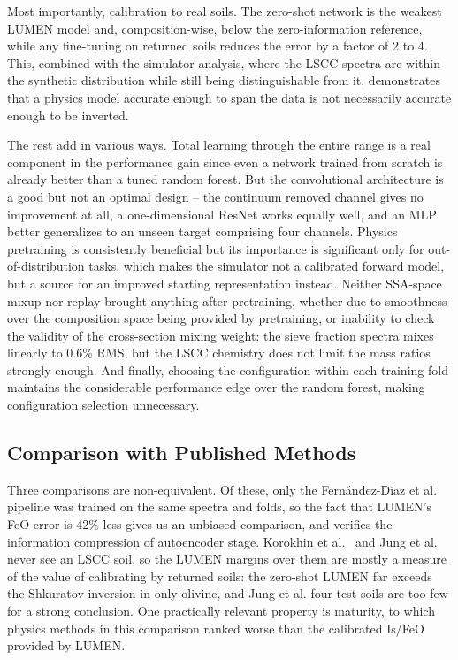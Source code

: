 \documentclass[remotesensing,article,submit,pdftex,moreauthors]{Definitions/mdpi}
\begin{document}
Most importantly, calibration to real soils. The zero-shot network is the weakest LUMEN model and, composition-wise, below the zero-information reference, while any fine-tuning on returned soils reduces the error by a factor of 2 to 4. This, combined with the simulator analysis, where the LSCC spectra are within the synthetic distribution while still being distinguishable from it, demonstrates that a physics model accurate enough to span the data is not necessarily accurate enough to be inverted.

The rest add in various ways. Total learning through the entire range is a real component in the performance gain since even a network trained from scratch is already better than a tuned random forest. But the convolutional architecture is a good but not an optimal design -- the continuum removed channel gives no improvement at all, a one-dimensional ResNet works equally well, and an MLP better generalizes to an unseen target comprising four channels. Physics pretraining is consistently beneficial but its importance is significant only for out-of-distribution tasks, which makes the simulator not a calibrated forward model, but a source for an improved starting representation instead. Neither SSA-space mixup nor replay brought anything after pretraining, whether due to smoothness over the composition space being provided by pretraining, or inability to check the validity of the cross-section mixing weight: the sieve fraction spectra mixes linearly to 0.6\% RMS, but the LSCC chemistry does not limit the mass ratios strongly enough. And finally, choosing the configuration within each training fold maintains the considerable performance edge over the random forest, making configuration selection unnecessary.

\subsection{Comparison with Published Methods}

Three comparisons are non-equivalent. Of these, only the Fernández-Díaz et al.~\cite{fernandez2026} pipeline was trained on the same spectra and folds, so the fact that LUMEN's FeO error is 42\% less gives us an unbiased comparison, and verifies the information compression of autoencoder stage. Korokhin et al.~\cite{korokhin2024} and Jung et al.~\cite{jung2026} never see an LSCC soil, so the LUMEN margins over them are mostly a measure of the value of calibrating by returned soils: the zero-shot LUMEN far exceeds the Shkuratov inversion in only olivine, and Jung et al. four test soils are too few for a strong conclusion. One practically relevant property is maturity, to which physics methods in this comparison ranked worse than the calibrated Is/FeO provided by LUMEN.
\end{document}

